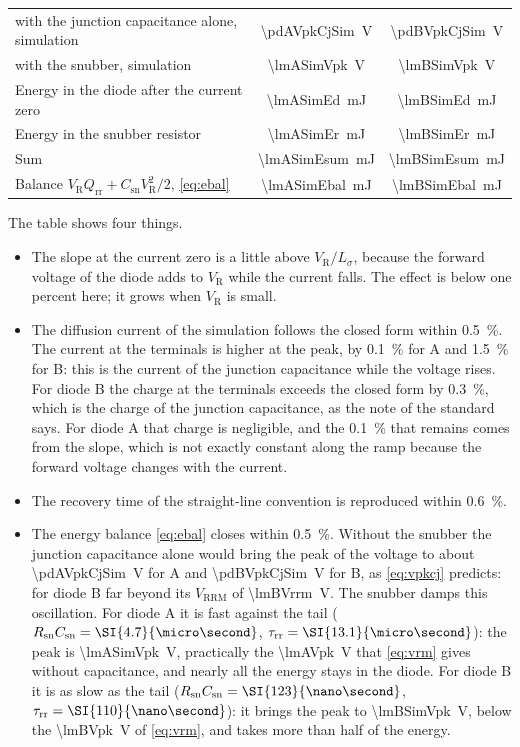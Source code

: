 \documentclass[10pt,a4paper]{scrartcl}
\newcommand{\VR}{V_\mathrm{R}}
\newcommand{\Qrr}{Q_\mathrm{rr}}
\newcommand{\taurr}{\tau_\mathrm{rr}}
\newcommand{\Csn}{C_\mathrm{sn}}
\newcommand{\Rsn}{R_\mathrm{sn}}
\newcommand{\Vrrm}{V_\mathrm{RRM}}
\newcommand{\Ls}{L_\sigma}                    %
\begin{document}
\begin{table}[htb]
\begin{tabular}{@{}lcc@{}}
\quad with the junction capacitance alone, simulation & \SI{\pdAVpkCjSim}{\volt} & \SI{\pdBVpkCjSim}{\volt} \\
\quad with the snubber, simulation & \SI{\lmASimVpk}{\volt} & \SI{\lmBSimVpk}{\volt} \\
Energy in the diode after the current zero & \SI{\lmASimEd}{\milli\joule} & \SI{\lmBSimEd}{\milli\joule} \\
Energy in the snubber resistor & \SI{\lmASimEr}{\milli\joule} & \SI{\lmBSimEr}{\milli\joule} \\
Sum & \SI{\lmASimEsum}{\milli\joule} & \SI{\lmBSimEsum}{\milli\joule} \\
Balance $\VR\Qrr + \Csn\VR^2/2$, \eqref{eq:ebal} & \SI{\lmASimEbal}{\milli\joule} & \SI{\lmBSimEbal}{\milli\joule} \\
\bottomrule
\end{tabular}
\end{table}

The table shows four things.
\begin{itemize}
\item The slope at the current zero is a little above $\VR/\Ls$, because the forward voltage of the diode adds to $\VR$ while the current falls. The effect is below one percent here; it grows when $\VR$ is small.
\item The diffusion current of the simulation follows the closed form within \SI{0.5}{\percent}. The current at the terminals is higher at the peak, by \SI{0.1}{\percent} for A and \SI{1.5}{\percent} for B: this is the current of the junction capacitance while the voltage rises. For diode B the charge at the terminals exceeds the closed form by \SI{0.3}{\percent}, which is the charge of the junction capacitance, as the note of the standard says. For diode A that charge is negligible, and the \SI{0.1}{\percent} that remains comes from the slope, which is not exactly constant along the ramp because the forward voltage changes with the current.
\item The recovery time of the straight-line convention is reproduced within \SI{0.6}{\percent}.
\item The energy balance \eqref{eq:ebal} closes within \SI{0.5}{\percent}. Without the snubber the junction capacitance alone would bring the peak of the voltage to about \SI{\pdAVpkCjSim}{\volt} for A and \SI{\pdBVpkCjSim}{\volt} for B, as \eqref{eq:vpkcj} predicts: for diode B far beyond its $\Vrrm$ of \SI{\lmBVrrm}{\volt}. The snubber damps this oscillation. For diode A it is fast against the tail ($\Rsn\Csn = \SI{\lmARsnCsn}{\micro\second}$, $\taurr = \SI{\lmATrr}{\micro\second}$): the peak is \SI{\lmASimVpk}{\volt}, practically the \SI{\lmAVpk}{\volt} that \eqref{eq:vrm} gives without capacitance, and nearly all the energy stays in the diode. For diode B it is as slow as the tail ($\Rsn\Csn = \SI{\lmBRsnCsn}{\nano\second}$, $\taurr = \SI{\lmBTrr}{\nano\second}$): it brings the peak to \SI{\lmBSimVpk}{\volt}, below the \SI{\lmBVpk}{\volt} of \eqref{eq:vrm}, and takes more than half of the energy.
\end{itemize}
\end{document}
